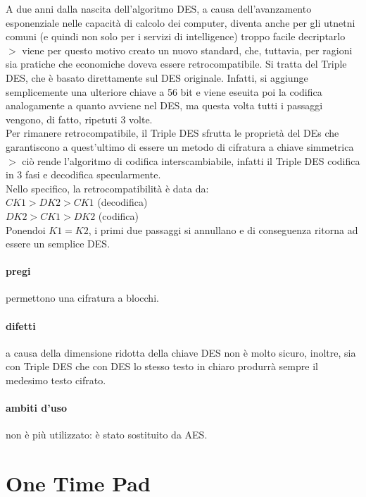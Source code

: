 \documentclass{article}
\begin{document}
A due anni dalla nascita dell'algoritmo DES, a causa dell'avanzamento
esponenziale nelle capacità di calcolo dei computer, diventa anche per gli
utnetni comuni (e quindi non solo per i servizi di intelligence) troppo facile
decriptarlo $>$ viene per questo motivo creato un nuovo standard, che, tuttavia,
per ragioni sia pratiche che economiche doveva essere retrocompatibile. Si
tratta del Triple DES, che è basato direttamente sul DES originale. Infatti, si
aggiunge semplicemente una ulteriore chiave a 56 bit e viene eseuita poi la
codifica analogamente a quanto avviene nel DES, ma questa volta tutti i passaggi
vengono, di fatto, ripetuti 3 volte.\\
Per rimanere retrocompatibile, il Triple DES sfrutta le proprietà del DEs che
garantiscono a quest'ultimo di essere un metodo di cifratura a chiave simmetrica
$>$ ciò rende l'algoritmo di codifica interscambiabile, infatti il Triple DES
codifica in 3 fasi e decodifica specularmente.\\
Nello specifico, la retrocompatibilità è data da:\\
$CK1 > DK2 > CK1$ (decodifica)\\
$DK2 > CK1 > DK2$ (codifica)\\
Ponendoi $K1 = K2$, i primi due passaggi si annullano e di conseguenza ritorna
ad essere un semplice DES.

\paragraph{pregi} permettono una cifratura a blocchi.

\paragraph{difetti} a causa della dimensione ridotta della chiave DES non è 
molto sicuro, inoltre, sia con Triple DES che con DES lo stesso testo in chiaro 
produrrà sempre il medesimo testo cifrato.

\paragraph{ambiti d'uso} non è più utilizzato: è stato sostituito da AES.

\section{One Time Pad}
\end{document}
